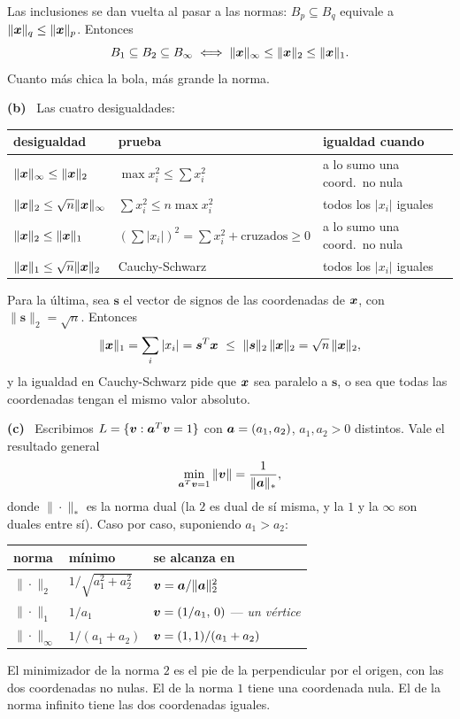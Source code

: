 \documentclass[11pt,a4paper]{article}
\newcommand{\bi}[1]{\boldsymbol{#1}}
\newcommand{\itemsol}[1]{\par\medskip\noindent\textbf{(#1)}\ \ignorespaces}
\begin{document}
Las inclusiones se dan vuelta al pasar a las normas: $B_p\subseteq B_q$ equivale
a $\|\bx\|_q\le\|\bx\|_p$. Entonces
\[
B_1\subseteq B_2\subseteq B_\infty
\iff \|\bx\|_\infty\le\|\bx\|_2\le\|\bx\|_1 .
\]
Cuanto más chica la bola, más grande la norma.

\itemsol{b} Las cuatro desigualdades:
\begin{center}
\begin{tabular}{@{}lll@{}}
\hline
desigualdad & prueba & igualdad cuando\\
\hline
$\|\bx\|_\infty\le\|\bx\|_2$ & $\max x_i^2\le\sum x_i^2$ & a lo sumo una coord.\ no nula\\
$\|\bx\|_2\le\sqrt n\|\bx\|_\infty$ & $\sum x_i^2\le n\max x_i^2$ & todos los $|x_i|$ iguales\\
$\|\bx\|_2\le\|\bx\|_1$ & $(\sum|x_i|)^2=\sum x_i^2+\text{cruzados}\ge0$ & a lo sumo una coord.\ no nula\\
$\|\bx\|_1\le\sqrt n\|\bx\|_2$ & Cauchy-Schwarz & todos los $|x_i|$ iguales\\
\hline
\end{tabular}
\end{center}
Para la última, sea $\bi{s}$ el vector de signos de las coordenadas de $\bx$, con
$\|\bi{s}\|_2=\sqrt n$. Entonces
\[
\|\bx\|_1=\sum_i|x_i|=\bi{s}^T\bx\ \le\ \|\bi{s}\|_2\,\|\bx\|_2
=\sqrt n\,\|\bx\|_2 ,
\]
y la igualdad en Cauchy-Schwarz pide que $\bx$ sea paralelo a $\bi{s}$, o sea que
todas las coordenadas tengan el mismo valor absoluto.

\itemsol{c} Escribimos $L=\{\bv:\ba^T\bv=1\}$ con $\ba=(a_1,a_2)$, $a_1,a_2>0$
distintos. Vale el resultado general
\[
\min_{\ba^T\bv=1}\|\bv\|=\frac{1}{\|\ba\|_{*}} ,
\]
donde $\|\cdot\|_{*}$ es la norma dual (la $2$ es dual de sí misma, y la $1$ y la
$\infty$ son duales entre sí). Caso por caso, suponiendo $a_1>a_2$:
\begin{center}
\begin{tabular}{@{}lll@{}}
\hline
norma & mínimo & se alcanza en\\
\hline
$\|\cdot\|_2$ & $1/\sqrt{a_1^2+a_2^2}$ & $\bv=\ba/\|\ba\|_2^2$\\
$\|\cdot\|_1$ & $1/a_1$ & $\bv=(1/a_1,\,0)$ --- \emph{un vértice}\\
$\|\cdot\|_\infty$ & $1/(a_1+a_2)$ & $\bv=(1,1)/(a_1+a_2)$\\
\hline
\end{tabular}
\end{center}
El minimizador de la norma $2$ es el pie de la perpendicular por el origen, con
las dos coordenadas no nulas. El de la norma $1$ tiene una coordenada nula. El de
la norma infinito tiene las dos coordenadas iguales.
\end{document}
